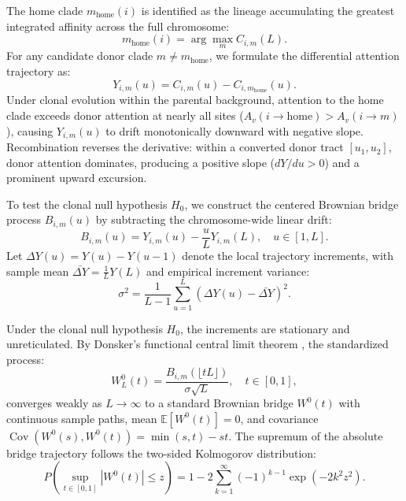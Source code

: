 The home clade $m_{\text{home}}(i)$ is identified as the lineage accumulating the greatest integrated affinity across the full chromosome:
\begin{equation}
m_{\text{home}}(i) = \arg\max_m C_{i, m}(L).
\label{eq:methods_home_clade}
\end{equation}
For any candidate donor clade $m \neq m_{\text{home}}$, we formulate the differential attention trajectory as:
\begin{equation}
Y_{i, m}(u) = C_{i, m}(u) - C_{i, m_{\text{home}}}(u).
\label{eq:methods_diff_trajectory}
\end{equation}
Under clonal evolution within the parental background, attention to the home clade exceeds donor attention at nearly all sites ($A_v(i \to \text{home}) > A_v(i \to m)$), causing $Y_{i, m}(u)$ to drift monotonically downward with negative slope.
Recombination reverses the derivative: within a converted donor tract $[u_1, u_2]$, donor attention dominates, producing a positive slope ($dY/du > 0$) and a prominent upward excursion.

To test the clonal null hypothesis $H_0$, we construct the centered Brownian bridge process $B_{i, m}(u)$ by subtracting the chromosome-wide linear drift:
\begin{equation}
B_{i, m}(u) = Y_{i, m}(u) - \frac{u}{L} Y_{i, m}(L), \quad u \in [1, L].
\label{eq:methods_brownian_bridge}
\end{equation}
Let $\Delta Y(u) = Y(u) - Y(u-1)$ denote the local trajectory increments, with sample mean $\bar{\Delta Y} = \frac{1}{L} Y(L)$ and empirical increment variance:
\begin{equation}
\sigma^2 = \frac{1}{L - 1} \sum_{u=1}^L \left( \Delta Y(u) - \bar{\Delta Y} \right)^2.
\label{eq:methods_sigma_sq}
\end{equation}

Under the clonal null hypothesis $H_0$, the increments are stationary and unreticulated.
By Donsker's functional central limit theorem \citep{donsker1951invariance}, the standardized process:
\begin{equation}
W_L^0(t) = \frac{B_{i, m}(\lfloor t L \rfloor)}{\sigma \sqrt{L}}, \quad t \in [0, 1],
\label{eq:methods_donsker_bridge}
\end{equation}
converges weakly as $L \to \infty$ to a standard Brownian bridge $W^0(t)$ with continuous sample paths, mean $\mathbb{E}[W^0(t)] = 0$, and covariance $\operatorname{Cov}(W^0(s), W^0(t)) = \min(s, t) - s t$.
The supremum of the absolute bridge trajectory follows the two-sided Kolmogorov distribution:
\begin{equation}
P\left( \sup_{t \in [0, 1]} |W^0(t)| \le z \right) = 1 - 2 \sum_{k=1}^\infty (-1)^{k-1} \exp\left(-2 k^2 z^2\right).
\label{eq:methods_kolmogorov_cdf}
\end{equation}

